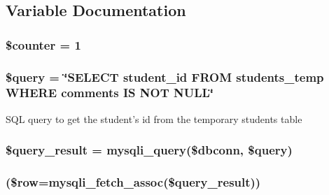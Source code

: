 \subsection{\-Variable \-Documentation}
\hypertarget{showComments_8php_adc0a189fac719187ba2e6f01ca0f2466}{
\subsubsection[{\$counter}]{\setlength{\rightskip}{0pt plus 5cm}\$counter = 1}}\label{showComments_8php_adc0a189fac719187ba2e6f01ca0f2466}
\hypertarget{showComments_8php_af59a5f7cd609e592c41dc3643efd3c98}{
\subsubsection[{\$query}]{\setlength{\rightskip}{0pt plus 5cm}\$query = \char`\"{}\-S\-E\-L\-E\-C\-T student\-\_\-id \-F\-R\-O\-M students\-\_\-temp \-W\-H\-E\-R\-E comments \-I\-S \-N\-O\-T \-N\-U\-L\-L\char`\"{}}}\label{showComments_8php_af59a5f7cd609e592c41dc3643efd3c98}
\-S\-Q\-L query to get the student's id from the temporary students table \hypertarget{showComments_8php_ade0b3dacf5d65d8f2293ffa78561fe31}{
\subsubsection[{\$query\-\_\-result}]{\setlength{\rightskip}{0pt plus 5cm}\$query\-\_\-result = mysqli\-\_\-query(\$dbconn, \$query)}}\label{showComments_8php_ade0b3dacf5d65d8f2293ffa78561fe31}
\hypertarget{showComments_8php_abbca5b4e0da1a7b7e95bb777ad93473d}{
\subsubsection[{while}]{(\$row=mysqli\-\_\-fetch\-\_\-assoc(\$query\-\_\-result))}}\label{showComments_8php_abbca5b4e0da1a7b7e95bb777ad93473d}
